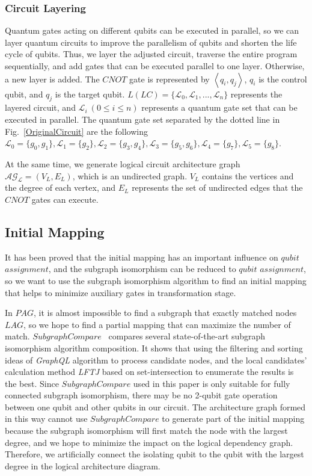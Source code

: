 \documentclass[runningheads]{llncs}
\begin{document}
\subsubsection{Circuit Layering}
Quantum gates acting on different qubits can be executed in parallel, so we can layer quantum circuits to improve the parallelism of qubits and shorten the life cycle of qubits. Thus, we layer the adjusted circuit, traverse the entire program sequentially, and add gates that can be executed parallel to one layer. Otherwise, a new layer is added. The $CNOT$ gate is represented by $\left \langle  \textit{q}_\textit{i}, \textit{q}_\textit{j} \right \rangle $, $\textit{q}_\textit{i}$ is the control qubit, and $\textit{q}_\textit{j}$ is the target qubit. $L(LC)=\{\mathcal{L}_{0},\mathcal{L}_{1},...,\mathcal{L}_{n}\}$ represents the layered circuit, and $\mathcal{L}_{i} \ (0 \le i \le n) $ represents a quantum gate set that can be executed in parallel. The quantum gate set separated by the dotted line in Fig.~\ref{OriginalCircuit} are the following $\mathcal{L}_{0}=\{g_{0},g_{1}\},\mathcal{L}_{1}=\{g_{2}\},
 \mathcal{L}_{2}=\{g_{3},g_{4}\},\mathcal{L}_{3}=\{g_{5},g_{6}\},\mathcal{L}_{4}=\{g_{7}\},\mathcal{L}_{5}=\{g_{8}\}$.

At the same time, we generate logical circuit architecture graph $\mathcal{AG_{L}}=(V_{L},E_{L})$, which is an undirected graph. $V_{L}$ contains the vertices and the degree of each vertex, and $E_{L}$ represents the set of undirected edges that the $CNOT$ gates can execute.

\subsection{Initial Mapping}
It has been proved that the initial mapping has an important influence on $qubit$  $ assignment$,  and the subgraph isomorphism can be reduced to $qubit$ $ assignment$, so we want to use the subgraph isomorphism algorithm to find an initial mapping that helps to minimize auxiliary gates in transformation stage.

In $PAG$, it is almost impossible to find a subgraph that exactly matched nodes $LAG$, so we hope to find a partial mapping that can maximize the number of match. $SubgraphCompare$~\cite{Sun2020} compares several state-of-the-art subgraph isomorphism algorithm composition. 
It shows that using the filtering and sorting ideas of \emph{GraphQL} algorithm to process candidate nodes, and the local candidates' calculation method \emph{LFTJ} based on set-intersection to enumerate the results is the best. Since $SubgraphCompare$ used in this paper is only suitable for fully connected subgraph isomorphism, there may be no 2-qubit gate operation between one qubit and other qubits in our circuit. The architecture graph formed in this way cannot use $SubgraphCompare$ to generate part of the initial mapping because the subgraph isomorphism will first match the node with the largest degree,  and we hope to minimize the impact on the logical dependency graph. Therefore, we artificially connect the isolating qubit to the qubit with the largest degree in the logical architecture diagram.
\end{document}
